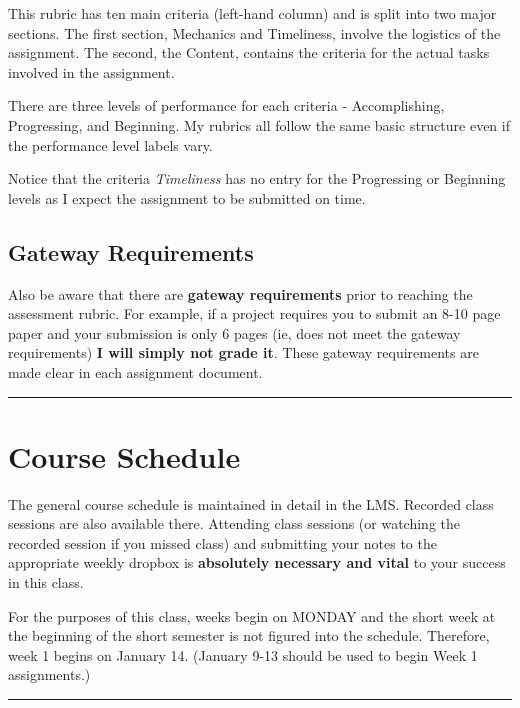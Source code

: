 \documentclass[]{article}
\begin{document}
This rubric has ten main criteria (left-hand column) and is split into
two major sections. The first section, Mechanics and Timeliness, involve
the logistics of the assignment. The second, the Content, contains the
criteria for the actual tasks involved in the assignment.

There are three levels of performance for each criteria - Accomplishing,
Progressing, and Beginning. My rubrics all follow the same basic
structure even if the performance level labels vary.

Notice that the criteria \emph{Timeliness} has no entry for the
Progressing or Beginning levels as I expect the assignment to be
submitted on time.

\hypertarget{gateway-requirements}{%
\subsection{Gateway Requirements}\label{gateway-requirements}}

Also be aware that there are \textbf{gateway requirements} prior to
reaching the assessment rubric. For example, if a project requires you
to submit an 8-10 page paper and your submission is only 6 pages (ie,
does not meet the gateway requirements) \textbf{I will simply not grade
it}. These gateway requirements are made clear in each assignment
document.

\begin{center}\rule{0.5\linewidth}{\linethickness}\end{center}

\hypertarget{course-schedule}{%
\section{Course Schedule}\label{course-schedule}}

The general course schedule is maintained in detail in the LMS. Recorded
class sessions are also available there. Attending class sessions (or
watching the recorded session if you missed class) and submitting your
notes to the appropriate weekly dropbox is \textbf{absolutely necessary
and vital} to your success in this class.

For the purposes of this class, weeks begin on MONDAY and the short week
at the beginning of the short semester is not figured into the schedule.
Therefore, week 1 begins on January 14. (January 9-13 should be used to
begin Week 1 assignments.)

\begin{center}\rule{0.5\linewidth}{\linethickness}\end{center}
\end{document}
